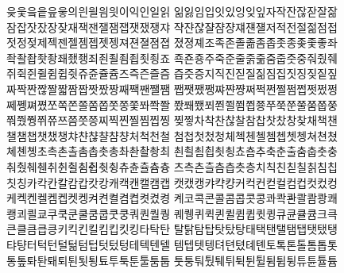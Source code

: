 읒읓읔읕읖읗의읜읠읨읫이익인일읽 읾잃임입잇있잉잊잎자작잔잖잗잘잚 \\

잠잡잣잤장잦재잭잰잴잼잽잿쟀쟁쟈 쟉쟌쟎쟐쟘쟝쟤쟨쟬저적전절젊점접 \\

젓정젖제젝젠젤젬젭젯젱져젼졀졈졉 졌졍졔조족존졸졺좀좁좃종좆좇좋좌 \\

좍좔좝좟좡좨좼좽죄죈죌죔죕죗죙죠 죡죤죵주죽준줄줅줆줌줍줏중줘줬줴 \\

쥐쥑쥔쥘쥠쥡쥣쥬쥰쥴쥼즈즉즌즐즘 즙즛증지직진짇질짊짐집짓징짖짙짚 \\

짜짝짠짢짤짧짬짭짯짰짱째짹짼쨀쨈 쨉쨋쨌쨍쨔쨘쨩쩌쩍쩐쩔쩜쩝쩟쩠쩡 \\

쩨쩽쪄쪘쪼쪽쫀쫄쫌쫍쫏쫑쫓쫘쫙쫠 쫬쫴쬈쬐쬔쬘쬠쬡쭁쭈쭉쭌쭐쭘쭙쭝 \\

쭤쭸쭹쮜쮸쯔쯤쯧쯩찌찍찐찔찜찝찡 찢찧차착찬찮찰참찹찻찼창찾채책챈 \\



챌챔챕챗챘챙챠챤챦챨챰챵처척천철 첨첩첫첬청체첵첸첼쳄쳅쳇쳉쳐쳔쳤 \\

쳬쳰촁초촉촌촐촘촙촛총촤촨촬촹최 쵠쵤쵬쵭쵯쵱쵸춈추축춘출춤춥춧충 \\

춰췄췌췐취췬췰췸췹췻췽츄츈츌츔츙 츠측츤츨츰츱츳층치칙친칟칠칡침칩 \\

칫칭카칵칸칼캄캅캇캉캐캑캔캘캠캡 캣캤캥캬캭컁커컥컨컫컬컴컵컷컸컹 \\

케켁켄켈켐켑켓켕켜켠켤켬켭켯켰켱 켸코콕콘콜콤콥콧콩콰콱콴콸쾀쾅쾌 \\

쾡쾨쾰쿄쿠쿡쿤쿨쿰쿱쿳쿵쿼퀀퀄퀑 퀘퀭퀴퀵퀸퀼큄큅큇큉큐큔큘큠크큭 \\

큰클큼큽킁키킥킨킬킴킵킷킹타탁탄 탈탉탐탑탓탔탕태택탠탤탬탭탯탰탱 \\

탸턍터턱턴털턺텀텁텃텄텅테텍텐텔 템텝텟텡텨텬텼톄톈토톡톤톨톰톱톳 \\



통톺톼퇀퇘퇴퇸툇툉툐투툭툰툴툼툽 툿퉁퉈퉜퉤튀튁튄튈튐튑튕튜튠튤튬 \\

